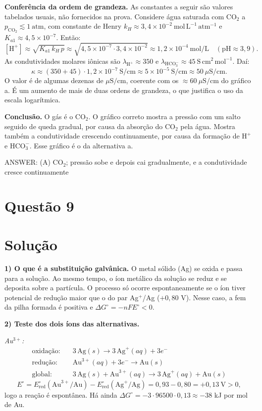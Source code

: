 \documentclass{article}%
\begin{document}
\textbf{Conferência da ordem de grandeza.} As constantes a seguir são valores tabelados usuais, não fornecidos na prova. Considere água saturada com CO$_2$ a $p_{\mathrm{CO_2}}\lesssim 1\ \mathrm{atm}$, com constante de Henry $k_H\approx 3{,}4\times10^{-2}\ \mathrm{mol\,L^{-1}\,atm^{-1}}$ e $K_{a1}\approx4{,}5\times10^{-7}$. Então:
\[
[\mathrm{H^+}]\approx\sqrt{K_{a1}\,k_H\,p}\approx\sqrt{4{,}5\times10^{-7}\cdot3{,}4\times10^{-2}}\approx1{,}2\times10^{-4}\ \mathrm{mol/L}\quad(\mathrm{pH}\approx3{,}9).
\]
As condutividades molares iônicas são $\lambda_{\mathrm{H^+}}\approx350$ e $\lambda_{\mathrm{HCO_3^-}}\approx45\ \mathrm{S\,cm^2\,mol^{-1}}$. Daí:
\[
\kappa\approx(350+45)\cdot1{,}2\times10^{-7}\ \mathrm{S/cm}\approx5\times10^{-5}\ \mathrm{S/cm}\approx 50\ \mu\mathrm{S/cm}.
\]
O valor é de algumas dezenas de $\mu\mathrm{S/cm}$, coerente com os $\approx 60\ \mu\mathrm{S/cm}$ do gráfico a. É um aumento de mais de duas ordens de grandeza, o que justifica o uso da escala logarítmica.

\textbf{Conclusão.} O gás é o CO$_2$. O gráfico correto mostra a pressão com um salto seguido de queda gradual, por causa da absorção do CO$_2$ pela água. Mostra também a condutividade crescendo continuamente, por causa da formação de $\mathrm{H^+}$ e $\mathrm{HCO_3^-}$. Esse gráfico é o da alternativa a.

ANSWER: (A) CO$_2$; pressão sobe e depois cai gradualmente, e a condutividade cresce continuamente%
\newpage%
\section*{Questão 9}

\section*{Solução}

\textbf{1) O que é a substituição galvânica.} O metal sólido (Ag) se oxida e passa para a solução. Ao mesmo tempo, o íon metálico da solução se reduz e se deposita sobre a partícula. O processo só ocorre espontaneamente se o íon tiver potencial de redução maior que o do par Ag$^{+}$/Ag ($+0{,}80$ V). Nesse caso, a fem da pilha formada é positiva e $\Delta G^\circ=-nFE^\circ<0$.

\textbf{2) Teste dos dois íons das alternativas.}

\emph{Au$^{3+}$:}
\[
\begin{aligned}
\text{oxidação:}&\quad 3\,\text{Ag}(s)\rightarrow 3\,\text{Ag}^{+}(aq)+3e^{-}\\
\text{redução:}&\quad \text{Au}^{3+}(aq)+3e^{-}\rightarrow \text{Au}(s)\\
\text{global:}&\quad 3\,\text{Ag}(s)+\text{Au}^{3+}(aq)\rightarrow 3\,\text{Ag}^{+}(aq)+\text{Au}(s)
\end{aligned}
\]
\[
E^\circ=E^\circ_{\text{red}}(\text{Au}^{3+}/\text{Au})-E^\circ_{\text{red}}(\text{Ag}^{+}/\text{Ag})=0{,}93-0{,}80=+0{,}13\ \text{V}>0,
\]
logo a reação é espontânea. Há ainda $\Delta G^\circ=-3\cdot 96500\cdot 0{,}13\approx -38$ kJ por mol de Au.
\end{document}
